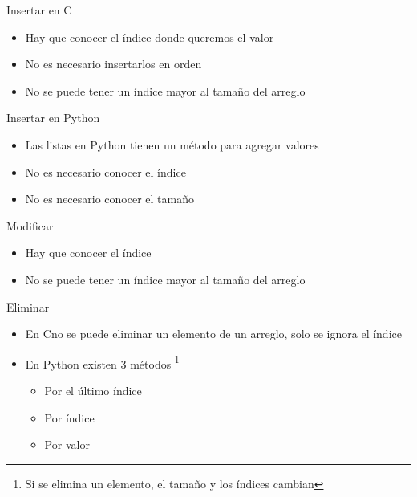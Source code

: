 \documentclass{beamer}
\newcommand{\Rplus}{\protect\hspace{-.1em}\protect\raisebox{.35ex}{\smaller{\smaller\textbf{+}}}}
\newcommand{\Cpp}{\mbox{C\Rplus\Rplus}\hspace{3pt}}
\begin{document}
\begin{frame}{Insertar en \Cpp}
	\begin{itemize}
		\item Hay que conocer el \'indice donde queremos el valor
		\item No es necesario insertarlos en orden
		\item No se puede tener un \'indice mayor al tamaño del arreglo
	\end{itemize}
	\centering
\end{frame}

\begin{frame}{Insertar en Python}
	\begin{itemize}
		\item Las listas en Python tienen un m\'etodo para agregar valores
		\item No es necesario conocer el \'indice
		\item No es necesario conocer el tamaño 
	\end{itemize}
\end{frame}

\begin{frame}{Modificar}
	\begin{itemize}
		\item Hay que conocer el \'indice
		\item No se puede tener un \'indice mayor al tamaño del arreglo
	\end{itemize}
\end{frame}

\begin{frame}{Eliminar}
	\begin{itemize}
		\item En \Cpp no se puede eliminar un elemento de un arreglo, solo se ignora el \'indice 
		\item En Python existen 3 m\'etodos \footnote{Si se elimina un elemento, el tamaño y los \'indices cambian}
		\begin{itemize}
			\item Por el \'ultimo \'indice
			\item Por \'indice
			\item Por valor
		\end{itemize}
	\end{itemize}
\end{frame}
\end{document}

